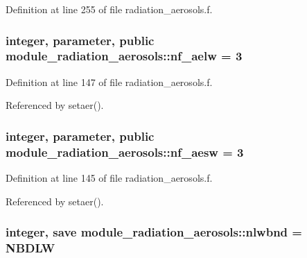 Definition at line 255 of file radiation\+\_\+aerosols.\+f.

\subsubsection[{\texorpdfstring{nf\+\_\+aelw}{nf_aelw}}]{\setlength{\rightskip}{0pt plus 5cm}integer, parameter, public module\+\_\+radiation\+\_\+aerosols\+::nf\+\_\+aelw = 3}\hypertarget{namespacemodule__radiation__aerosols_afba0069cd611248a9595a126a13f5203}{}\label{namespacemodule__radiation__aerosols_afba0069cd611248a9595a126a13f5203}


Definition at line 147 of file radiation\+\_\+aerosols.\+f.



Referenced by setaer().

\subsubsection[{\texorpdfstring{nf\+\_\+aesw}{nf_aesw}}]{\setlength{\rightskip}{0pt plus 5cm}integer, parameter, public module\+\_\+radiation\+\_\+aerosols\+::nf\+\_\+aesw = 3}\hypertarget{namespacemodule__radiation__aerosols_ae0d9615fa694e2a5dfe8fb48e99b7e76}{}\label{namespacemodule__radiation__aerosols_ae0d9615fa694e2a5dfe8fb48e99b7e76}


Definition at line 145 of file radiation\+\_\+aerosols.\+f.



Referenced by setaer().

\subsubsection[{\texorpdfstring{nlwbnd}{nlwbnd}}]{\setlength{\rightskip}{0pt plus 5cm}integer, save module\+\_\+radiation\+\_\+aerosols\+::nlwbnd = N\+B\+D\+LW\hspace{0.3cm}{\ttfamily [private]}}\hypertarget{namespacemodule__radiation__aerosols_ab17b7f75d6d737fd2fc81eae44cba81d}{}\label{namespacemodule__radiation__aerosols_ab17b7f75d6d737fd2fc81eae44cba81d}


